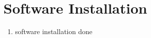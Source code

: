 \documentclass[journal,12pt,twocolumn]{IEEEtran}
\renewcommand\thesection{\arabic{section}}
\begin{document}



\maketitle


\tableofcontents


\renewcommand{\thefigure}{\theenumi}
\renewcommand{\thetable}{\theenumi}



\bigskip



\section{Software Installation}
\begin{enumerate}[label=\thesection.\arabic*
,ref=\thesection.\theenumi]
\item
software installation done
\end{enumerate}
\end{document}
